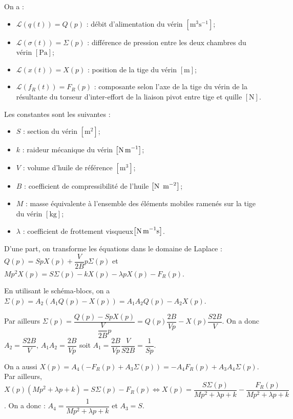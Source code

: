 On a :
\begin{itemize}
\item $\mathcal{L}\left(q(t)\right)=Q(p)$ : débit d’alimentation du vérin $\left[\text{m}^3\text{s}^{-1}\right]$;
\item $\mathcal{L}\left(\sigma(t)\right)=\Sigma(p)$ : différence de pression entre les deux chambres du vérin $\left[\text{Pa}\right]$;
\item $\mathcal{L}\left(x(t)\right)=X(p)$ : position de la tige du vérin $\left[\text{m}\right]$;
\item $\mathcal{L}\left(f_R(t)\right)=F_R(p)$ : composante selon l'axe de la tige du vérin de la résultante du torseur d'inter-effort de la liaison pivot entre tige et quille $\left[\text{N}\right]$.
\end{itemize}
Les constantes sont les suivantes :
\begin{itemize}
\item $S$ : section du vérin $\left[\text{m}^2\right]$;
\item $k$ : raideur mécanique du vérin $\left[\text{N\,m}^{-1}\right]$;
\item $V$ : volume d'huile de référence $\left[\text{m}^{3}\right]$;
\item $B$ : coefficient de compressibilité de l'huile $\left[\text{N\, m}^{-2}\right]$;
\item $M$ : masse équivalente à l'ensemble des éléments mobiles ramenés sur la tige du vérin $\left[\text{kg}\right]$;
\item $\lambda$ : coefficient de frottement visqueux$\left[\text{N\,m}^{-1}\text{s}\right]$.
\end{itemize} 

\fi
{}
\ifprof

D'une part, on transforme les équations dans le domaine de Laplace : 
$Q(p)=S p X(p)+\dfrac{V}{2B} p \Sigma(p)$ et
$Mp^2 X(p) = S \Sigma(p) - kX(p)-\lambda p X(p) - F_R(p)$.

En utilisant le schéma-blocs, on a $\Sigma(p)=A_2\left(A_1Q(p)-X(p)\right) = A_1A_2Q(p)-A_2X(p)$.

Par ailleurs $\Sigma(p)=\dfrac{Q(p)-S p X(p)}{\dfrac{V}{2B} p}= Q(p)\dfrac{2B}{Vp}-  X(p)  \dfrac{S2B}{V} $. On a donc $A_2 = \dfrac{S2B}{V} $, $A_1 A_2 = \dfrac{2B}{Vp}$ soit $A_1  = \dfrac{2B}{Vp}\dfrac{V}{S2B}= \dfrac{1}{Sp}$. 


On a aussi $X(p)=A_4\left(-F_R(p)+A_3\Sigma(p)\right) =-A_4F_R(p)+A_3A_4\Sigma(p)$. Par ailleurs,
$X(p) \left(Mp^2  +\lambda p  + k\right)= S \Sigma(p) - F_R(p) \Leftrightarrow X(p) =  \dfrac{S \Sigma(p)}{Mp^2  +\lambda p  + k}-\dfrac{F_R(p)}{Mp^2  +\lambda p  + k}$. On a donc : $A_4 = \dfrac{1}{Mp^2  +\lambda p  + k}$ et $A_3 = S$.


